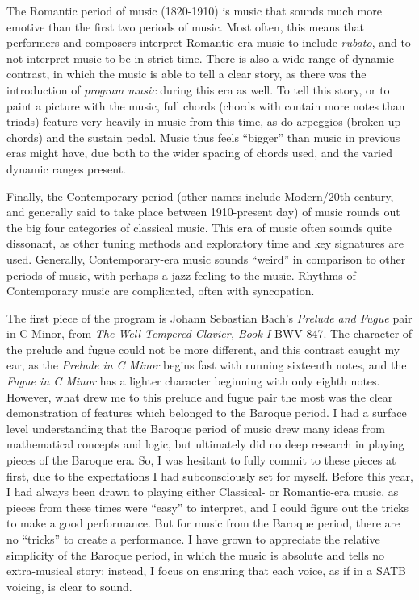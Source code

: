 The Romantic period of music (1820-1910) is music that sounds much more emotive than the first two periods of music. Most often, this means that performers and composers interpret Romantic era music to include \textit{rubato}, and to not interpret music to be in strict time. There is also a wide range of dynamic contrast, in which the music is able to tell a clear story, as there was the introduction of \textit{program music} during this era as well. To tell this story, or to paint a picture with the music, full chords (chords with contain more notes than triads) feature very heavily in music from this time, as do arpeggios (broken up chords) and the sustain pedal. Music thus feels ``bigger'' than music in previous eras might have, due both to the wider spacing of chords used, and the varied dynamic ranges present. 

Finally, the Contemporary period (other names include Modern/20th century, and generally said to take place between 1910-present day) of music rounds out the big four categories of classical music. This era of music often sounds quite dissonant, as other tuning methods and exploratory time and key signatures are used. Generally, Contemporary-era music sounds ``weird'' in comparison to other periods of music, with perhaps a jazz feeling to the music. Rhythms of Contemporary music are complicated, often with syncopation. 

The first piece of the program is Johann Sebastian Bach's \textit{Prelude and Fugue} pair in C Minor, from \textit{The Well-Tempered Clavier, Book I} BWV 847. The character of the prelude and fugue could not be more different, and this contrast caught my ear, as the \textit{Prelude in C Minor} begins fast with running sixteenth notes, and the \textit{Fugue in C Minor} has a lighter character beginning with only eighth notes. However, what drew me to this prelude and fugue pair the most was the clear demonstration of features which belonged to the Baroque period. I had a surface level understanding that the Baroque period of music drew many ideas from mathematical concepts and logic, but ultimately did no deep research in playing pieces of the Baroque era. So, I was hesitant to fully commit to these pieces at first, due to the expectations I had subconsciously set for myself. Before this year, I had always been drawn to playing either Classical- or Romantic-era music, as pieces from these times were ``easy'' to interpret, and I could figure out the tricks to make a good performance. But for music from the Baroque period, there are no ``tricks'' to create a performance. I have grown to appreciate the relative simplicity of the Baroque period, in which the music is absolute and tells no extra-musical story; instead, I focus on ensuring that each voice, as if in a SATB voicing, is clear to sound.

